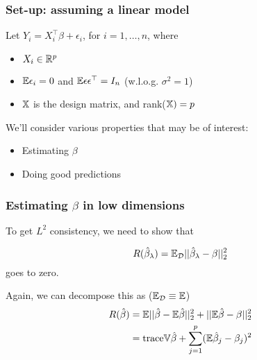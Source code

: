\documentclass[12pt]{beamer}
\begin{document}
\title{}
\subtitle{\classTitle}
\date{}



\begin{frame}
\maketitle
%
\organization
%
\end{frame}


\begin{frame}
\frametitle{Set-up: assuming a linear model}
Let $Y_i = X_i^{\top} \beta + \epsilon_i$, for $i=1,\ldots,n$,
where
\begin{itemize}
\item $X_i \in \mathbb{R}^{p}$
\item $\mathbb{E}\epsilon_i = 0$ and $\mathbb{E} \epsilon \epsilon^{\top} = I_n$ (w.l.o.g. $\sigma^2 = 1$)
\item $\mathbb{X}$ is the design matrix, and rank($\mathbb{X}) = p$
\end{itemize}

\vsp
We'll consider various properties that may be of interest:
\begin{itemize}
\item Estimating $\beta$
\item Doing good predictions
\end{itemize}
\end{frame}

\begin{frame}
\frametitle{Estimating $\beta$ in low dimensions}
To get $L^2$ consistency, we need to show that 

\[
R(\hat\beta_{\lambda}) = \mathbb{E}_{\mathcal{D}} ||\hat\beta_{\lambda} - \beta||_2^2
\]
goes to zero.

\vsp
Again, we can decompose this as ($\mathbb{E}_{\mathcal{D}} \equiv \mathbb{E}$)
\begin{align}
R(\hat\beta) 
& = 
\mathbb{E} ||\hat\beta - \mathbb{E}\hat\beta||_2^2 + ||\mathbb{E}\hat\beta - \beta||_2^2  \\
& =
\textrm{trace} \mathbb{V} \hat\beta + \sum_{j=1}^p(\mathbb{E}\hat\beta_j - \beta_j)^2
\end{align}

\end{frame}
\end{document}
